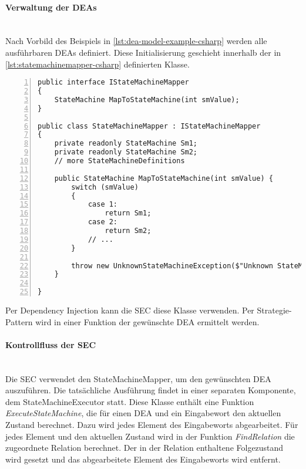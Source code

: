 \paragraph*{Verwaltung der DEAs} \mbox{}\\
Nach Vorbild des Beispiels in \cref{lst:dea-model-example-csharp} werden alle ausführbaren DEAs definiert. Diese Initialisierung geschieht innerhalb der in \cref{lst:statemachinemapper-csharp} definierten Klasse. 

\begin{lstlisting}[language={[Sharp]C}, breaklines=true, tabsize=2, showstringspaces=false, frame=single, numbers=left, basicstyle=\small,label = {lst:statemachinemapper-csharp}, caption={Modellierung eines StateMachineMappers in C\#}, captionpos=b] 
public interface IStateMachineMapper 
{
	StateMachine MapToStateMachine(int smValue);
}

public class StateMachineMapper : IStateMachineMapper
{
	private readonly StateMachine Sm1;
	private readonly StateMachine Sm2;
	// more StateMachineDefinitions
	
	public StateMachine MapToStateMachine(int smValue) {
		switch (smValue) 
		{
			case 1:
				return Sm1;
			case 2: 
				return Sm2;
			// ...
		}
		
        throw new UnknownStateMachineException($"Unknown StateMachine for value [{smValue}].");
	}
	
}
\end{lstlisting}

Per Dependency Injection kann die SEC diese Klasse verwenden. Per Strategie-Pattern wird in einer Funktion der gewünschte DEA ermittelt werden.

\paragraph*{Kontrollfluss der SEC} \mbox{}\\
Die SEC verwendet den StateMachineMapper, um den gewünschten DEA auszuführen. Die tatsächliche Ausführung findet in einer separaten Komponente, dem StateMachineExecutor statt. Diese Klasse enthält eine Funktion \textit{ExecuteStateMachine}, die für einen DEA und ein Eingabewort den aktuellen Zustand berechnet. Dazu wird jedes Element des Eingabeworts abgearbeitet. Für jedes Element und den aktuellen Zustand wird in der Funktion \textit{FindRelation} die zugeordnete Relation berechnet. Der in der Relation enthaltene Folgezustand wird gesetzt und das abgearbeitete Element des Eingabeworts wird entfernt. 

